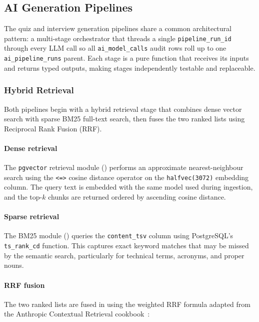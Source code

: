 \subsection{AI Generation Pipelines}
\label{sec:impl_ai_pipelines}

The quiz and interview generation pipelines share a common architectural pattern: a multi-stage orchestrator that threads a single \texttt{pipeline\_run\_id} through every LLM call so all \texttt{ai\_model\_calls} audit rows roll up to one \texttt{ai\_pipeline\_runs} parent. Each stage is a pure function that receives its inputs and returns typed outputs, making stages independently testable and replaceable.

\subsubsection{Hybrid Retrieval}
\label{sec:impl_retrieval}

Both pipelines begin with a hybrid retrieval stage that combines dense vector search with sparse BM25 full-text search, then fuses the two ranked lists using Reciprocal Rank Fusion (RRF).

\paragraph{Dense retrieval}
The \texttt{pgvector} retrieval module () performs an approximate nearest-neighbour search using the \texttt{<=>} cosine distance operator on the \texttt{halfvec(3072)} embedding column. The query text is embedded with the same model used during ingestion, and the top-$k$ chunks are returned ordered by ascending cosine distance.

\paragraph{Sparse retrieval}
The BM25 module () queries the \texttt{content\_tsv} column using PostgreSQL's \texttt{ts\_rank\_cd} function. This captures exact keyword matches that may be missed by the semantic search, particularly for technical terms, acronyms, and proper nouns.

\paragraph{RRF fusion}
The two ranked lists are fused in  using the weighted RRF formula adapted from the Anthropic Contextual Retrieval cookbook~\cite{anthropic2024contextual}:

